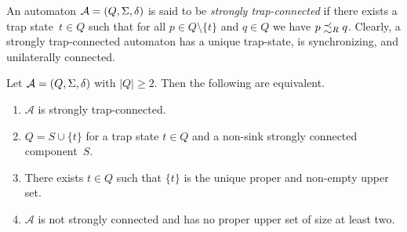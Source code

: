 An automaton $\mathcal A = (Q, \Sigma, \delta)$
is said to be \emph{strongly trap-connected} if there exists a trap state~$t \in Q$
such that for all $p \in Q \setminus \{t\}$ and $q \in Q$
we have $p \precsim_R q$. Clearly, a strongly trap-connected
automaton has a unique trap-state, is synchronizing,
and unilaterally connected.

\begin{proposition}\label{prelim:automata:prop:char-strongly-trap}
	Let $\mathcal A = (Q, \Sigma, \delta)$ with $|Q| \ge 2$.
	Then the following are equivalent.
	
	\begin{enumerate}
		\item \label{prelim:automata:prop:char-strongly-trap:1} $\mathcal A$ is strongly trap-connected.
		
		\item \label{prelim:automata:prop:char-strongly-trap:1b} $Q = S \cup \{t\}$ for a trap state $t \in Q$ and a non-sink strongly connected component~$S$.
		
		\item \label{prelim:automata:prop:char-strongly-trap:2} There exists $t \in Q$ such that $\{t\}$ is the unique proper and non-empty upper set.
		
		\item \label{prelim:automata:prop:char-strongly-trap:3} $\mathcal A$ is not strongly connected and has no proper upper set of size at least two.
	\end{enumerate}
\end{proposition}
